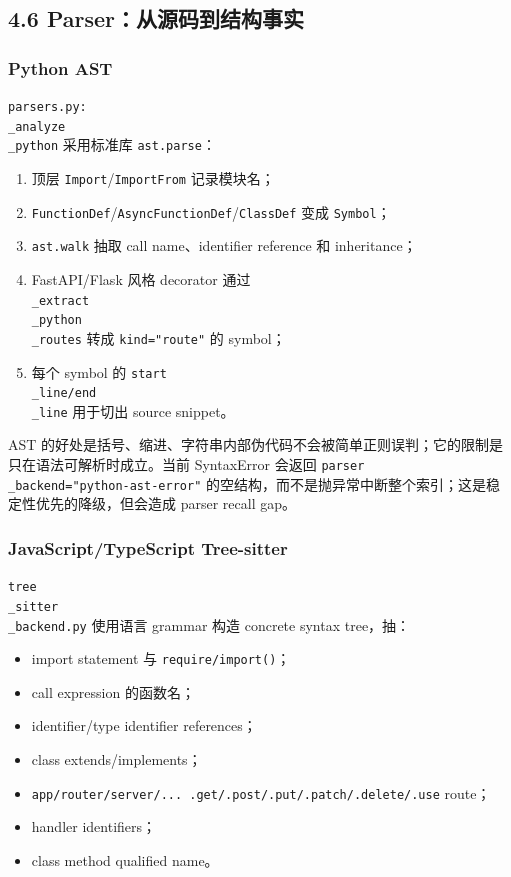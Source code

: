 \documentclass[UTF8,12pt,openany]{ctexbook}
\begin{document}
\subsection{4.6 Parser：从源码到结构事实}

\subsubsection{Python AST}

\texttt{parsers.py:\\_analyze\\_python} 采用标准库 \texttt{ast.parse}：\par

\begin{enumerate}
\item 顶层 \texttt{Import}/\texttt{ImportFrom} 记录模块名；
\item \texttt{FunctionDef}/\texttt{AsyncFunctionDef}/\texttt{ClassDef} 变成 \texttt{Symbol}；
\item \texttt{ast.walk} 抽取 call name、identifier reference 和 inheritance；
\item FastAPI/Flask 风格 decorator 通过 \texttt{\\_extract\\_python\\_routes} 转成 \texttt{kind="route"} 的 symbol；
\item 每个 symbol 的 \texttt{start\\_line/end\\_line} 用于切出 source snippet。
\end{enumerate}

AST 的好处是括号、缩进、字符串内部伪代码不会被简单正则误判；它的限制是只在语法可解析时成立。当前 SyntaxError 会返回 \texttt{parser\\_backend="python-ast-error"} 的空结构，而不是抛异常中断整个索引；这是稳定性优先的降级，但会造成 parser recall gap。\par

\subsubsection{JavaScript/TypeScript Tree-sitter}

\texttt{tree\\_sitter\\_backend.py} 使用语言 grammar 构造 concrete syntax tree，抽：\par

\begin{itemize}
\item import statement 与 \texttt{require/import()}；
\item call expression 的函数名；
\item identifier/type identifier references；
\item class extends/implements；
\item \texttt{app/router/server/... .get/.post/.put/.patch/.delete/.use} route；
\item handler identifiers；
\item class method qualified name。
\end{itemize}
\end{document}
